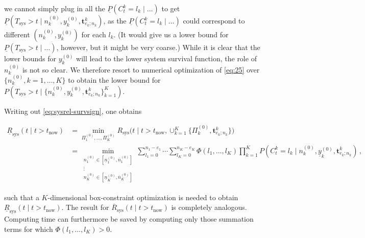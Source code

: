 \documentclass[Journal,SectionNumbers,InsideFigs]{ascelike}
\newcommand{\mbf}[1]{\mathbf{#1}}
\renewcommand{\vec}[1]{{\bm#1}}
\newcommand{\uz}{^{(0)}} %
\newcommand{\ul}[1]{\underline{#1}}
\newcommand{\ol}[1]{\overline{#1}}
\newcommand{\Rsys}{R_\text{sys}}
\newcommand{\lRsys}{\ul{R}_\text{sys}}
\newcommand{\uRsys}{\ol{R}_\text{sys}}
\def\Rsys{R_\text{sys}}
\def\Tsys{T_\text{sys}}
\def\ykz{y\uz_k}
\def\ykzl{\ul{y}\uz_k}
\def\nkz{n\uz_k}
\newcommand{\nkzfun}[1]{n\uz_{#1}}
\newcommand{\nkzlfun}[1]{\ul{n}\uz_{#1}}
\newcommand{\nkzufun}[1]{\ol{n}\uz_{#1}}
\def\PkZ{\Pi\uz_k}
\newcommand{\PZi}[1]{\Pi\uz_{#1}}
\def\tnow{t_\text{now}}
\begin{document}
we cannot simply plug in all the $\ul{P}(C^k_t = l_k\mid \ldots)$ %
to get $\ul{P}(\Tsys > t\mid\nkz,\ykz, \mbf{t}^k_{e_k;n_k})$, %
as the $\ul{P}(C^k_t = l_k\mid \ldots)$ could correspond to different $(\nkz,\ykz)$ for each $l_k$.
(It would give us a lower bound for $\ul{P}(\Tsys > t\mid\ldots)$, however, but it might be very coarse.)
%
While it is clear that the lower bounds for $\ykz$ will lead to the lower system survival function,
the role of $\nkz$ is not so clear.
We therefore resort to numerical optimization of \eqref{eq:25} over $\{\nkz, k=1,\ldots,K\}$
to obtain the lower bound for $P(\Tsys > t\mid\{\nkz,\ykz, \mbf{t}^k_{e_k;n_k}\}_{k=1}^K)$.
\fi %

Writing out \eqref{eq:sysrel-survsign}, one obtains
\begin{linenomath*}
\begin{align}
\lRsys(t \mid t > \tnow)
 &= \min_{\PZi{1},\ldots,\PZi{K}} \Rsys\big(t \mid t > \tnow, \cup_{k=1}^K \{\PkZ, \vec{t}^k_{e_k;n_k}\}\big) \nonumber\\
 &= \min_{\substack{\nkzfun{1} \in \left[\nkzlfun{1}, \nkzufun{1}\right]\\ \vdots\\ \nkzfun{K} \in \left[\nkzlfun{K}, \nkzufun{K}\right]}}
    \sum_{l_1=0}^{n_1-e_1} \cdots \sum_{l_K=0}^{n_K-e_K} \Phi(l_1,\ldots,l_K) \prod_{k=1}^K P(C^k_t = l_k\mid\nkz,\ykzl, \mbf{t}^k_{e_k;n_k})\,,
\label{eq:sysrel-optim-n0}
\end{align}
\end{linenomath*}
such that a $K$-dimensional box-constraint optimization is needed to obtain $\lRsys(t \mid t > \tnow)$.
The result for $\uRsys(t \mid t > \tnow)$ is completely analogous.
Computing time can furthermore be saved
by computing only those %
summation terms for which $\Phi(l_1,\ldots,l_K) > 0$.
\end{document}
